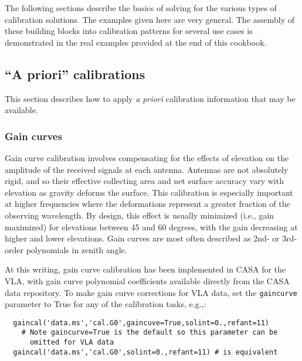 The following sections describe the basics of solving for the various
types of calibration solutions.  The examples given here are very
general.  The assembly of these building blocks into calibration
patterns for several use cases is demonstrated in the real examples
provided at the end of this cookbook.  

\subsection{``A priori'' calibrations}
\label{subsection:a.priori.cals}

This section describes how to apply {\it a priori} calibration
information that may be available.

\subsubsection{Gain curves}
\label{subsubsection:a.priori.gain.curves}

Gain curve calibration involves compensating for the effects of
elevation on the amplitude of the received signals at each antenna.
Antennas are not absolutely rigid, and so their effective collecting
area and net surface accuracy vary with elevation as gravity deforms
the surface.  This calibration is especially important at higher
frequencies where the deformations represent a greater fraction of the
observing wavelength.  By design, this effect is usually minimized
(i.e., gain maximized) for elevations between 45 and 60 degrees, with
the gain decreasing at higher and lower elevations.  Gain curves are
most often described as 2nd- or 3rd-order polynomials in zenith angle.

At this writing, gain curve calibration has been implemented in CASA
for the VLA, with gain curve polynomial coefficients available
directly from the CASA data repository.  To make gain curve
corrections for VLA data, set the {\tt gaincurve} parameter to True
for any of the calibration tasks, e.g.,:

\small
\begin{verbatim}
  gaincal('data.ms','cal.G0',gaincuve=True,solint=0.,refant=11)
    # Note gaincurve=True is the default so this parameter can be 
      omitted for VLA data
  gaincal('data.ms','cal.G0',solint=0.,refant=11) # is equivalent
\end{verbatim}
\normalsize

